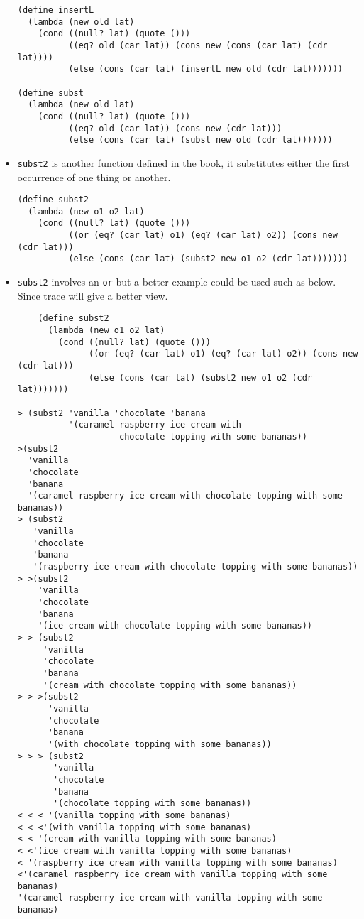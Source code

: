 \documentclass[11pt]{article}
\begin{document}
\begin{itemize}
\begin{verbatim}
(define insertL
  (lambda (new old lat)
    (cond ((null? lat) (quote ()))
          ((eq? old (car lat)) (cons new (cons (car lat) (cdr lat))))
          (else (cons (car lat) (insertL new old (cdr lat)))))))

(define subst
  (lambda (new old lat)
    (cond ((null? lat) (quote ()))
          ((eq? old (car lat)) (cons new (cdr lat)))
          (else (cons (car lat) (subst new old (cdr lat)))))))

\end{verbatim}
\item \texttt{subst2} is another function defined in the book, it substitutes either the first occurrence of one thing or another.
\begin{verbatim}
(define subst2
  (lambda (new o1 o2 lat)
    (cond ((null? lat) (quote ()))
          ((or (eq? (car lat) o1) (eq? (car lat) o2)) (cons new (cdr lat)))
          (else (cons (car lat) (subst2 new o1 o2 (cdr lat)))))))

\end{verbatim}
\item \texttt{subst2} involves an \texttt{or} but a better example could be used such as below. Since trace will give a better view.
\begin{verbatim}
    (define subst2
      (lambda (new o1 o2 lat)
        (cond ((null? lat) (quote ()))
              ((or (eq? (car lat) o1) (eq? (car lat) o2)) (cons new (cdr lat)))
              (else (cons (car lat) (subst2 new o1 o2 (cdr lat)))))))

> (subst2 'vanilla 'chocolate 'banana
          '(caramel raspberry ice cream with
                    chocolate topping with some bananas))
>(subst2
  'vanilla
  'chocolate
  'banana
  '(caramel raspberry ice cream with chocolate topping with some bananas))
> (subst2
   'vanilla
   'chocolate
   'banana
   '(raspberry ice cream with chocolate topping with some bananas))
> >(subst2
    'vanilla
    'chocolate
    'banana
    '(ice cream with chocolate topping with some bananas))
> > (subst2
     'vanilla
     'chocolate
     'banana
     '(cream with chocolate topping with some bananas))
> > >(subst2
      'vanilla
      'chocolate
      'banana
      '(with chocolate topping with some bananas))
> > > (subst2
       'vanilla
       'chocolate
       'banana
       '(chocolate topping with some bananas))
< < < '(vanilla topping with some bananas)
< < <'(with vanilla topping with some bananas)
< < '(cream with vanilla topping with some bananas)
< <'(ice cream with vanilla topping with some bananas)
< '(raspberry ice cream with vanilla topping with some bananas)
<'(caramel raspberry ice cream with vanilla topping with some bananas)
'(caramel raspberry ice cream with vanilla topping with some bananas)


\end{verbatim}
\end{itemize}
\end{document}
